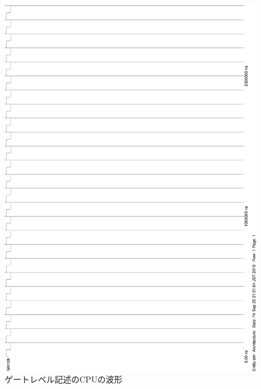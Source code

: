 \documentclass[a4j]{jarticle}
\begin{document}
\begin{figure}[p]
    \vspace*{-20mm}
    \begin{center}
        \includegraphics[height=\textheight]{wave-gate1.eps}\\[10mm]
        ゲートレベル記述のCPUの波形
    \end{center}
\end{figure}
\end{document}
